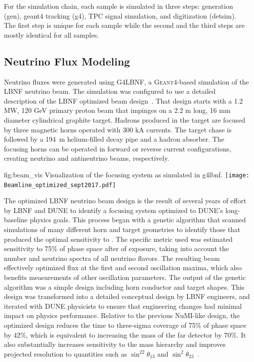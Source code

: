 For the simulation chain, each sample is simulated in three steps: generation (gen), {\sc geant4} tracking (g4), TPC signal simulation, and digitization (detsim). The first step is unique for each sample while the second and the third steps are mostly identical for all samples. 

\subsection{Neutrino Flux Modeling}
\label{sec:tools-mc-flux}

Neutrino fluxes were generated using G4LBNF, a \textsc{Geant}4\xspace-based simulation of the LBNF neutrino beam.  The simulation was configured to use a detailed description of the LBNF optimized beam design~\cite{optimizedbeamcdr}.  That design starts with a 1.2 MW, 120 GeV primary proton beam that impinges on a 2.2 m long, 16 mm diameter cylindrical graphite target.  Hadrons produced in the target are focused by three magnetic horns operated with 300 kA currents.  The target chase is followed by a 194~m helium-filled decay pipe and a hadron absorber.  The focusing horns can be operated in forward or reverse current configurations, creating neutrino and antineutrino beams, respectively.   

\begin{dunefigure}{fig:beam_vis}
{Visualization of the focusing system as simulated in g4lbnf.}
    \texttt{[image: Beamline\_optimized\_sept2017.pdf]}\end{dunefigure}

The optimized LBNF neutrino beam design is the result of several years of effort by LBNF and DUNE to identify a focusing system optimized to DUNE's long-baseline physics goals.  This process began with a genetic algorithm that scanned simulations of many different horn and target geometries to identify those that produced the optimal sensitivity to .  The specific metric used was estimated sensitivity to 75\% of  phase space after   %
of exposure, taking into account the number and neutrino spectra of all neutrino flavors. The resulting beam effectively optimized flux at the first and second oscillation maxima, which also benefits measurements of other oscillation parameters.  The output of the genetic algorithm was a simple design including horn conductor and target shapes.  This design was transformed into a detailed conceptual design by LBNF engineers, and iterated with DUNE physicists to ensure that engineering changes had minimal impact on physics performance.  Relative to the previous NuMI-like design, the optimized design reduces the time to three-sigma coverage of 75\% of  phase space by 42\%, which is equivalent to increasing the mass of the far detector by 70\%.  It also substantially increases sensitivity to the mass hierarchy and improves projected resolution to quantities such as $\sin^22\theta_{13}$ and $\sin^2\theta_{23}$~\cite{fields_doc_2901}.        

